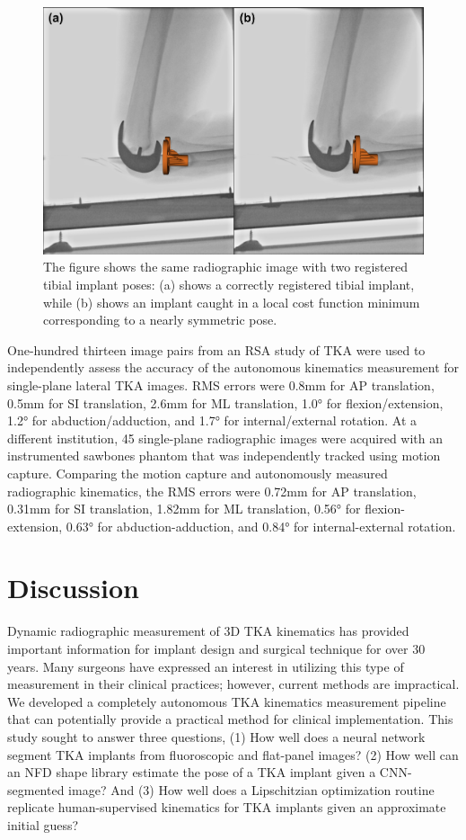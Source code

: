 \begin{figure}[!h]
	\centering
	\includegraphics[width = \linewidth]{figs/jtml-paper/fig6-symtrap.png}
	\caption{The figure shows the same radiographic image with two registered tibial implant poses: (a) shows a correctly registered tibial implant, while (b) shows an implant caught in a local cost function minimum corresponding to a nearly symmetric pose.}
	\label{fig:sym-trap}
\end{figure}

One-hundred thirteen image pairs from an RSA study of TKA were used to independently assess the accuracy of the autonomous kinematics measurement for single-plane lateral TKA images. RMS errors were 0.8mm for AP translation, 0.5mm for SI translation, 2.6mm for ML translation, 1.0° for flexion/extension, 1.2° for abduction/adduction, and 1.7° for internal/external rotation. At a different institution, 45 single-plane radiographic images were acquired with an instrumented sawbones phantom that was independently tracked using motion capture. Comparing the motion capture and autonomously measured radiographic kinematics, the RMS errors were 0.72mm for AP translation, 0.31mm for SI translation, 1.82mm for ML translation, 0.56° for flexion-extension, 0.63° for abduction-adduction, and 0.84° for internal-external rotation.

\section{Discussion}
Dynamic radiographic measurement of 3D TKA kinematics has provided important information for implant design and surgical technique for over 30 years. Many surgeons have expressed an interest in utilizing this type of measurement in their clinical practices; however, current methods are impractical. We developed a completely autonomous TKA kinematics measurement pipeline that can potentially provide a practical method for clinical implementation. This study sought to answer three questions, (1) How well does a neural network segment TKA implants from fluoroscopic and flat-panel images? (2) How well can an NFD shape library estimate the pose of a TKA implant given a CNN-segmented image? And (3) How well does a Lipschitzian optimization routine replicate human-supervised kinematics for TKA implants given an approximate initial guess?

